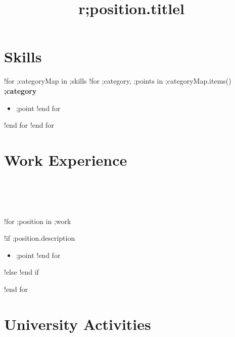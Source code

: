 \documentclass[margin,line]{res}
\begin{document}
\begin{sloppypar}

\address{;contact.phone\hspace{1cm};contact.email}

\begin{resume}

\section{Skills}
!for ;categoryMap in ;skills
    !for ;category, ;points in ;categoryMap.items()
        {\bf ;category}
        \begin{itemize}
        !for ;point in ;points
            \item ;point
        !end for
        \end{itemize}
    !end for
!end for


\section {Work Experience}

\begin{format}
  \title{r}\\
  \\
  \body\\
\end{format}

!for ;position in ;work
    \title{;position.title}
    \begin{position}
        \vspace{-.3cm}
        !if ;position.description
            \begin{itemize}
            !for ;point in ;position.description
                \item ;point
            !end for
            \end{itemize}
        !else
            \vspace{-.2cm}
        !end if
    \end{position}
!end for


\section {University Activities}

\begin{format}
  \title{l}\\
  \body\\
\end{format}


\end{resume}
\end{sloppypar}
\end{document}
